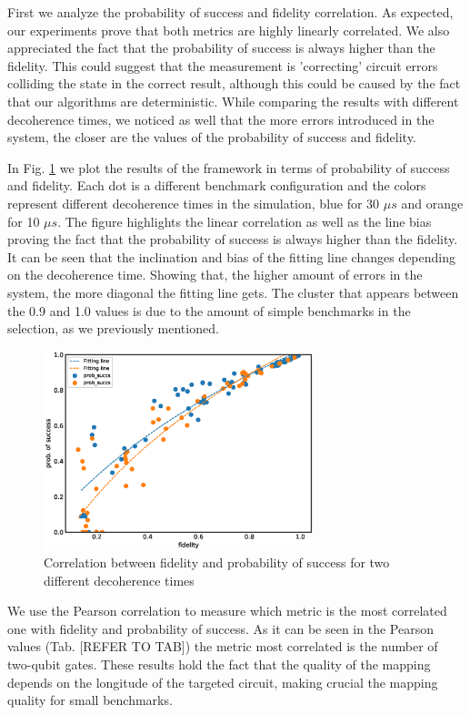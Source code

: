 First we analyze the probability of success and fidelity correlation.
As expected, our experiments prove that both metrics are highly linearly correlated.
We also appreciated the fact that the probability of success is always higher than the fidelity.
This could suggest that the measurement is 'correcting' circuit errors colliding the state in the correct result, although this could be caused by the fact that our algorithms are deterministic.
While comparing the results with different decoherence times, we noticed as well that the more errors introduced in the system, the closer are the values of the probability of success and fidelity.

In Fig. \ref{fig:orgd058dd5} we plot the results of the framework in terms of probability of success and fidelity. 
Each dot is a different benchmark configuration and the colors represent different decoherence times in the simulation, blue for 30 \(\mu s\) and orange for 10 \(\mu s\).
The figure highlights the linear correlation as well as the line bias proving the fact that the probability of success is always higher than the fidelity.
It can be seen that the inclination and bias of the fitting line changes depending on the decoherence time.
Showing that, the higher amount of errors in the system, the more diagonal the fitting line gets.
The cluster that appears between the 0.9 and 1.0 values is due to the amount of simple benchmarks in the selection, as we previously mentioned.

\begin{figure}[htbp]
\centering
\includegraphics[width=0.7\textwidth]{figures/f_ps_correlation.eps}
\caption{\label{fig:orgd058dd5}
Correlation between fidelity and probability of success for two different decoherence times}
\end{figure}



We use the Pearson correlation to measure which metric is the most correlated one with fidelity and probability of success.
As it can be seen in the Pearson values (Tab. [REFER TO TAB]) the metric most correlated is the number of two-qubit gates.
These results hold the fact that the quality of the mapping depends on the longitude of the targeted circuit, making crucial the mapping quality for small benchmarks.

